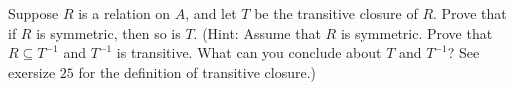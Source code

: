 \begin{tcolorbox}[title=Problem 30, breakable]
    Suppose $R$ is a relation on $A$, and let $T$ be the transitive closure of $R$.
    Prove that if $R$ is symmetric, then so is $T$. (Hint: Assume that $R$ is symmetric.
    Prove that $R \subseteq T^{-1}$ and $T^{-1}$ is transitive. What can you conclude 
    about $T$ and $T^{-1}$? See exersize $25$ for the definition of transitive closure.)
\end{tcolorbox}
